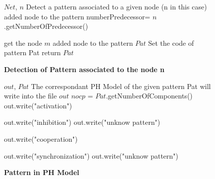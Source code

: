 
\begin{figure}[!t]
\begin{algorithmic}[1]
\REQUIRE $Net$, $n$
\ENSURE Detect a pattern associated to a given node (n in this case)
\STATE 
\STATE 
{}
   \STATE added node to the pattern
   \STATE numberPredecessor= $n$.getNumberOfPredecessor() 
   
    \STATE get the node $m$
      \STATE added node to the pattern $Pat$
      \STATE Set the code of pattern Pat
      \STATE return $Pat$
    \ENDCASE
    \ENDSWITCH
   \ENDFOR
   \ENDCASE
   
   \ENDSWITCH
\ENDCASE
\ENDSWITCH
\end{algorithmic}
\caption{\bf Detection of Pattern associated to the node n}\label{PatternDetectionNode}
\end{figure}




\begin{figure}[!t]
\begin{algorithmic}[1]
\REQUIRE $out$, $Pat$ 
\ENSURE The correspondant PH Model of the given pattern Pat will write into the file $out$
\STATE $nocp$ = $Pat$.getNumberOfComponents() 
\STATE 
{}
   \STATE out.write("activation")
        
\ENDCASE
{}
  \STATE out.write("inhibition")
\DEFAULT
 \STATE out.write("unknow pattern")
 \ENDDEFAULT
\ENDSWITCH
   
   
\ENDCASE

   \STATE out.write("cooperation")
        
\ENDCASE
{}
  \STATE out.write("synchronization")
\DEFAULT
 \STATE out.write("unknow pattern")
 \ENDDEFAULT
\ENDSWITCH
   
   
\ENDCASE
\ENDSWITCH
\end{algorithmic}
\caption{\bf Pattern in PH Model}\label{PHModel}
\end{figure}


